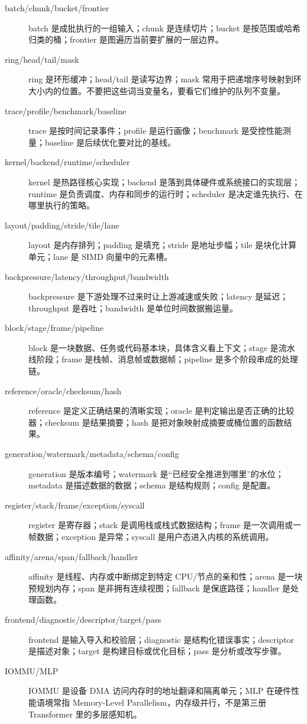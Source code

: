 \begin{description}
  \item[batch/chunk/bucket/frontier] batch 是成批执行的一组输入；chunk 是连续切片；bucket 是按范围或哈希归类的桶；frontier 是图遍历当前要扩展的一层边界。
  \item[ring/head/tail/mask] ring 是环形缓冲；head/tail 是读写边界；mask 常用于把递增序号映射到环大小内的位置。不要把这些词当变量名，要看它们维护的队列不变量。
  \item[trace/profile/benchmark/baseline] trace 是按时间记录事件；profile 是运行画像；benchmark 是受控性能测量；baseline 是后续优化要对比的基线。
  \item[kernel/backend/runtime/scheduler] kernel 是热路径核心实现；backend 是落到具体硬件或系统接口的实现层；runtime 是负责调度、内存和同步的运行时；scheduler 是决定谁先执行、在哪里执行的策略。
  \item[layout/padding/stride/tile/lane] layout 是内存排列；padding 是填充；stride 是地址步幅；tile 是块化计算单元；lane 是 SIMD 向量中的元素槽。
  \item[backpressure/latency/throughput/bandwidth] backpressure 是下游处理不过来时让上游减速或失败；latency 是延迟；throughput 是吞吐；bandwidth 是单位时间数据搬运量。
  \item[block/stage/frame/pipeline] block 是一块数据、任务或代码基本块，具体含义看上下文；stage 是流水线阶段；frame 是栈帧、消息帧或数据帧；pipeline 是多个阶段串成的处理链。
  \item[reference/oracle/checksum/hash] reference 是定义正确结果的清晰实现；oracle 是判定输出是否正确的比较器；checksum 是结果摘要；hash 是把对象映射成摘要或桶位置的函数结果。
  \item[generation/watermark/metadata/schema/config] generation 是版本编号；watermark 是“已经安全推进到哪里”的水位；metadata 是描述数据的数据；schema 是结构规则；config 是配置。
  \item[register/stack/frame/exception/syscall] register 是寄存器；stack 是调用栈或栈式数据结构；frame 是一次调用或一帧数据；exception 是异常；syscall 是用户态进入内核的系统调用。
  \item[affinity/arena/span/fallback/handler] affinity 是线程、内存或中断绑定到特定 CPU/节点的亲和性；arena 是一块预规划内存；span 是非拥有连续视图；fallback 是保底路径；handler 是处理函数。
  \item[frontend/diagnostic/descriptor/target/pass] frontend 是输入导入和校验层；diagnostic 是结构化错误事实；descriptor 是描述对象；target 是构建目标或优化目标；pass 是分析或改写步骤。
  \item[IOMMU/MLP] IOMMU 是设备 DMA 访问内存时的地址翻译和隔离单元；MLP 在硬件性能语境常指 Memory-Level Parallelism，内存级并行，不是第三册 Transformer 里的多层感知机。

\end{description}
